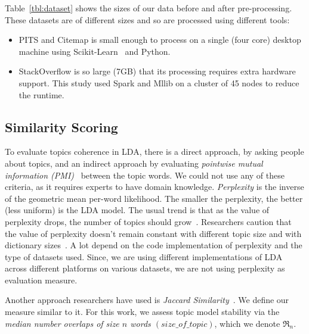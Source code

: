\documentclass[twocolumn,5p,sort&compress]{elsarticle}
\newcommand{\bi}{\begin{itemize}}
\newcommand{\ei}{\end{itemize}}
\theoremstyle{break}
\begin{document}
  Table~\ref{tbl:dataset} shows the sizes of our data before and after pre-processing.
  These datasets are of different sizes and so are processed using different tools:
  \bi
\item PITS and Citemap is small enough to process on a single (four core) desktop machine
  using Scikit-Learn~\cite{pedregosa2011scikit} and Python.
  \item StackOverflow is so large (7GB) that its  processing requires extra hardware support.
 This study used Spark and Mllib on a cluster of 45 nodes to
 reduce the runtime.
 \ei
  




\subsection{Similarity Scoring}
To evaluate topics coherence in LDA, there is a direct approach, by asking people about topics, and an indirect approach by evaluating \textit{pointwise mutual information (PMI)}~\cite{lau2014machine, o2015analysis} between the topic words. We could not use any of these criteria, as it requires experts to have domain knowledge. \textit{Perplexity} is  the inverse of the geometric mean per-word likelihood. The smaller the perplexity, the better (less uniform) is the LDA model. The usual trend is that as the value of perplexity drops, the number of topics should grow~\cite{koltcov2014latent}. Researchers caution that the value of perplexity doesn't remain constant with different topic size and with dictionary sizes~\cite{koltcov2014latent, zhao2015heuristic}. A lot depend on the code implementation of perplexity and the type of datasets used. Since, we are using different implementations of LDA across different platforms on various datasets, we are not using perplexity as evaluation measure.

Another approach researchers have used is \textit{Jaccard Similarity}~\cite{o2015analysis, galvis2013analysis}. We define our measure similar to it. For this work, we assess topic model stability via the {\em median number overlaps of size $n$ words $\mathit{(size\_of\_topic)}$}, which we denote  $\Re_n$.
\end{document}
